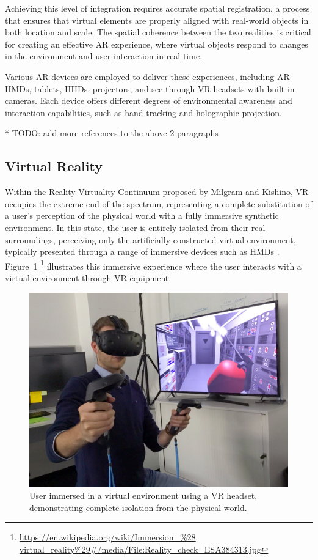     Achieving this level of integration requires accurate spatial registration, a process that ensures that virtual elements are properly aligned with real-world objects in both location and scale. The spatial coherence between the two realities is critical for creating an effective \ac{AR} experience, where virtual objects respond to changes in the environment and user interaction in real-time. 

    Various \ac{AR} devices are employed to deliver these experiences, including \ac{AR}-\ac{HMDs}, tablets, \ac{HHDs}, projectors, and see-through \ac{VR} headsets with built-in cameras. Each device offers different degrees of environmental awareness and interaction capabilities, such as hand tracking and holographic projection. 

    * TODO: add more references to the above 2 paragraphs

\subsection{Virtual Reality}
    
    Within the Reality-Virtuality Continuum proposed by Milgram and Kishino, \ac{VR} occupies the extreme end of the spectrum, representing a complete substitution of a user’s perception of the physical world with a fully immersive synthetic environment. In this state, the user is entirely isolated from their real surroundings, perceiving only the artificially constructed virtual environment, typically presented through a range of immersive devices such as \ac{HMDs} \cite{milgram1994}. Figure~\ref{f:real-virtual-continuum} \footnote{\url{https://en.wikipedia.org/wiki/Immersion_\%28
    virtual_reality\%29\#/media/File:Reality_check_ESA384313.jpg}} illustrates this immersive experience where the user interacts with a virtual environment through \ac{VR} equipment.

    \begin{figure}[h]
        \centering
        \includegraphics[width=0.6\linewidth]{figs/Reality_check_ESA384313.jpg}
        \caption{User immersed in a virtual environment using a VR headset, demonstrating complete isolation from the physical world.}
        \label{f:real-virtual-continuum}
    \end{figure}

